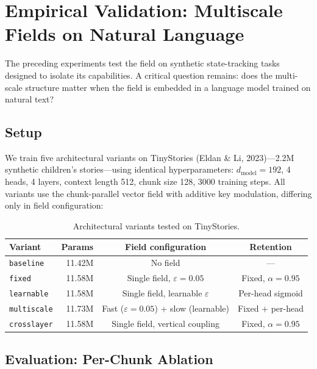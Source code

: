 \documentclass[11pt,a4paper]{article}
\newcommand{\evap}{\varepsilon}
\newcommand{\retain}{\alpha}
\begin{document}
\section{Empirical Validation: Multiscale Fields on Natural Language}
\label{sec:natural-language}

The preceding experiments test the field on synthetic state-tracking
tasks designed to isolate its capabilities.  A critical question
remains: does the multi-scale structure matter when the field is
embedded in a language model trained on natural text?

\subsection{Setup}

We train five architectural variants on TinyStories (Eldan \& Li,
2023)---2.2M synthetic children's stories---using identical
hyperparameters: $d_{\mathrm{model}} = 192$, 4 heads, 4 layers,
context length 512, chunk size 128, 3000 training steps.  All
variants use the chunk-parallel vector field with additive key
modulation, differing only in field configuration:

\begin{table}[h]
\centering
\caption{Architectural variants tested on TinyStories.}
\label{tab:variants}
\begin{tabular}{@{}lrcc@{}}
\toprule
Variant & Params & Field configuration & Retention \\
\midrule
\texttt{baseline}   & 11.42M & No field & --- \\
\texttt{fixed}      & 11.58M & Single field, $\evap = 0.05$ & Fixed, $\retain = 0.95$ \\
\texttt{learnable}  & 11.58M & Single field, learnable $\evap$ & Per-head sigmoid \\
\texttt{multiscale} & 11.73M & Fast ($\evap = 0.05$) + slow (learnable) & Fixed + per-head \\
\texttt{crosslayer} & 11.58M & Single field, vertical coupling & Fixed, $\retain = 0.95$ \\
\bottomrule
\end{tabular}
\end{table}

\subsection{Evaluation: Per-Chunk Ablation}
\end{document}
